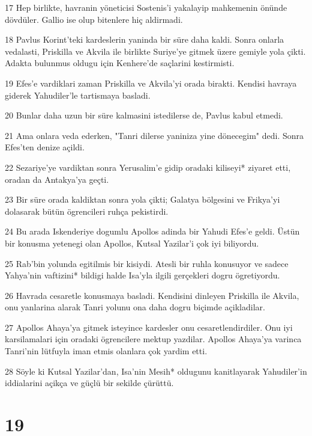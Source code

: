 \par 17 Hep birlikte, havranin yöneticisi Sostenis'i yakalayip mahkemenin önünde dövdüler. Gallio ise olup bitenlere hiç aldirmadi.
\par 18 Pavlus Korint'teki kardeslerin yaninda bir süre daha kaldi. Sonra onlarla vedalasti, Priskilla ve Akvila ile birlikte Suriye'ye gitmek üzere gemiyle yola çikti. Adakta bulunmus oldugu için Kenhere'de saçlarini kestirmisti.
\par 19 Efes'e vardiklari zaman Priskilla ve Akvila'yi orada birakti. Kendisi havraya giderek Yahudiler'le tartismaya basladi.
\par 20 Bunlar daha uzun bir süre kalmasini istedilerse de, Pavlus kabul etmedi.
\par 21 Ama onlara veda ederken, "Tanri dilerse yaniniza yine dönecegim" dedi. Sonra Efes'ten denize açildi.
\par 22 Sezariye'ye vardiktan sonra Yerusalim'e gidip oradaki kiliseyi* ziyaret etti, oradan da Antakya'ya geçti.
\par 23 Bir süre orada kaldiktan sonra yola çikti; Galatya bölgesini ve Frikya'yi dolasarak bütün ögrencileri ruhça pekistirdi.
\par 24 Bu arada Iskenderiye dogumlu Apollos adinda bir Yahudi Efes'e geldi. Üstün bir konusma yetenegi olan Apollos, Kutsal Yazilar'i çok iyi biliyordu.
\par 25 Rab'bin yolunda egitilmis bir kisiydi. Atesli bir ruhla konusuyor ve sadece Yahya'nin vaftizini* bildigi halde Isa'yla ilgili gerçekleri dogru ögretiyordu.
\par 26 Havrada cesaretle konusmaya basladi. Kendisini dinleyen Priskilla ile Akvila, onu yanlarina alarak Tanri yolunu ona daha dogru biçimde açikladilar.
\par 27 Apollos Ahaya'ya gitmek isteyince kardesler onu cesaretlendirdiler. Onu iyi karsilamalari için oradaki ögrencilere mektup yazdilar. Apollos Ahaya'ya varinca Tanri'nin lütfuyla iman etmis olanlara çok yardim etti.
\par 28 Söyle ki Kutsal Yazilar'dan, Isa'nin Mesih* oldugunu kanitlayarak Yahudiler'in iddialarini açikça ve güçlü bir sekilde çürüttü.

\chapter{19}

